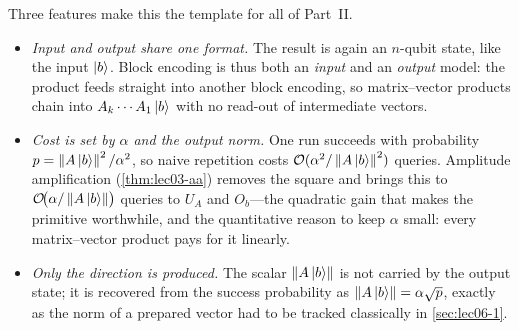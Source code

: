 Three features make this the template for all of Part~II.
\begin{itemize}[leftmargin=1.4em,nosep]
  \item \emph{Input and output share one format.} The result is again an $n$-qubit
        state, like the input $\ket{b}$. Block encoding is thus both an \emph{input}
        and an \emph{output} model: the product feeds straight into another block
        encoding, so matrix--vector products chain into $A_k\cdots A_1\ket{b}$ with no
        read-out of intermediate vectors.
  \item \emph{Cost is set by $\alpha$ and the output norm.} One run succeeds with
        probability $p=\left\lVert A\ket{b} \right\rVert^2/\alpha^2$, so naive repetition costs
        $\mathcal{O}(\alpha^2/\left\lVert A\ket{b} \right\rVert^2)$ queries. Amplitude amplification
        (\cref{thm:lec03-aa}) removes the square and brings this to
        $\mathcal{O}\!\bigl(\alpha/\left\lVert A\ket{b} \right\rVert\bigr)$ queries to $U_A$ and $O_b$---the
        quadratic gain that makes the primitive worthwhile, and the quantitative
        reason to keep $\alpha$ small: every matrix--vector product pays for it
        linearly.
  \item \emph{Only the direction is produced.} The scalar $\left\lVert A\ket{b} \right\rVert$ is not
        carried by the output state; it is recovered from the success probability as
        $\left\lVert A\ket{b} \right\rVert=\alpha\sqrt p$, exactly as the norm of a prepared vector had
        to be tracked classically in \cref{sec:lec06-1}.
\end{itemize}

